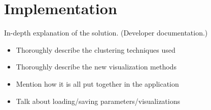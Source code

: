 \chapter{Implementation}

In-depth explanation of the solution. (Developer documentation.)

\begin{itemize}
\item Thoroughly describe the clustering techniques used
\item Thoroughly describe the new visualization methods
\item Mention how it is all put together in the application
\item Talk about loading/saving parameters/visualizations
\end{itemize}
